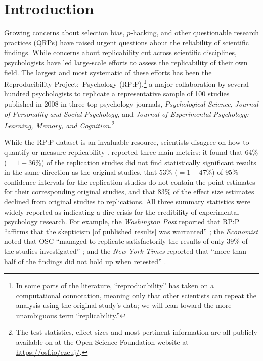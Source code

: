\documentclass[aoas, preprint]{imsart}
\theoremstyle{definition}
\theoremstyle{custom}
\begin{document}
\section{Introduction}
\label{sec:intro}

  Growing concerns about selection bias, $p$-hacking, and other questionable research practices (QRPs) have raised urgent questions about the reliability of scientific findings. While concerns about replicability cut across scientific disciplines, psychologists have led large-scale efforts to assess the replicability of their own field. The largest and most systematic of these efforts has been the Reproducibility Project:\ Psychology (RP:P),\footnote{In some parts of the literature, ``reproducibility'' has taken on a computational connotation, meaning only that other scientists can repeat the analysis using the original study's data; we will lean toward the more unambiguous term ``replicability.''} a major collaboration by several hundred psychologists to replicate a representative sample of 100 studies published in 2008 in three top psychology journals, {\em Psychological Science}, {\em Journal of Personality and Social Psychology}, and {\em Journal of Experimental Psychology: Learning, Memory, and Cognition}.\footnote{The test statistics, effect sizes and most pertinent information are all publicly available on at the Open Science Foundation website at \url{https://osf.io/ezcuj/}.}

  While the RP:P dataset is an invaluable resource, scientists disagree on how to quantify or measure replicability \citep{Goodman:2016bo,Amrhein:2017en}. \citet[OSC;][]{OpenScienceCollaboration:2015cn} reported three main metrics: it found that $64\%$ ($= 1 - 36\%$) of the replication studies did not find statistically significant results in the same direction as the original studies, that $53\%$ ($= 1 - 47\%$) of $95\%$ confidence intervals for the replication studies do not contain the point estimates for their corresponding original studies, and that $83\%$ of the effect size estimates declined from original studies to replications. All three summary statistics were widely reported as indicating a dire crisis for the credibility of experimental psychology research. For example, the {\em Washington Post} reported that RP:P ``affirms that the skepticism [of published results] was warranted'' \citep{Achenbach:2015vi}; the {\em Economist} noted that OSC ``managed to replicate satisfactorily the results of only $39\%$ of the studies investigated'' \citeyearpar{Anonymous:uoQKTVTm}; and the {\em New York Times} reported that ``more than half of the findings did not hold up when retested'' \citep{Carey:2015wp}.
\end{document}
